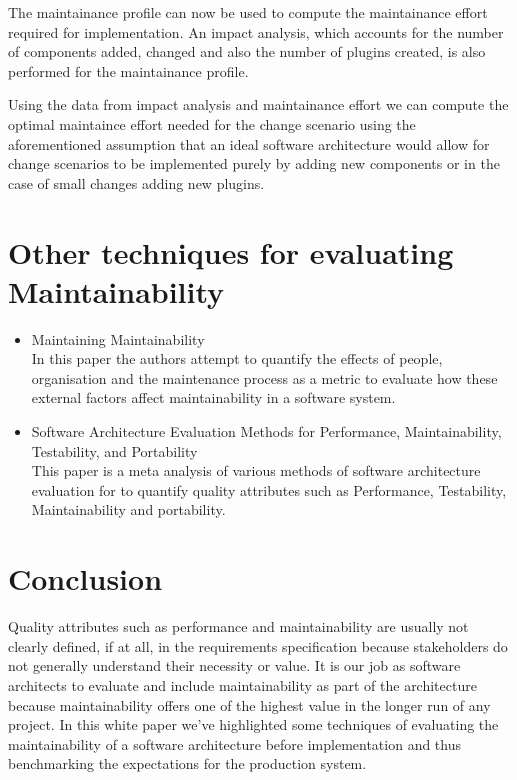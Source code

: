 \documentclass[15pt]{article}
\begin{document}
The maintainance profile can now be used to compute the maintainance effort required for implementation. An impact analysis, which accounts for the number of components added, changed and also the number of plugins created, is also performed for the maintainance profile. 

Using the data from impact analysis and maintainance effort we can compute the optimal maintaince effort needed for the change scenario using the aforementioned assumption that an ideal software architecture would allow for change scenarios to be implemented purely by adding new components or in the case of small changes adding new plugins. 


\section{Other techniques for evaluating Maintainability}

\begin{itemize}
\item Maintaining Maintainability \cite{ramage_maintaining_1998}\\
In this paper the authors attempt to quantify the effects of people, organisation and the maintenance process as a metric to evaluate how these external factors affect maintainability in a software system.

\item Software Architecture Evaluation Methods for Performance, Maintainability, Testability, and Portability \cite{mattsson_software_2006}\\
This paper is a meta analysis of various methods of software architecture evaluation for to quantify quality attributes such as Performance, Testability, Maintainability and portability.


\end{itemize}

\section{Conclusion}
Quality attributes such as performance and maintainability are usually not clearly defined, if at all, in the requirements specification because stakeholders do not generally understand their necessity or value. It is our job as software architects to evaluate and include maintainability as part of the architecture because maintainability offers one of the highest value in the longer run of any project. In this white paper we've highlighted some techniques of evaluating the maintainability of a software architecture before implementation and thus benchmarking the expectations for the production system.


\newpage


\end{document}
